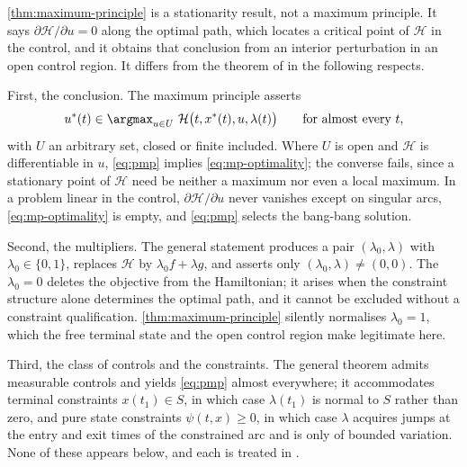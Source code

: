 \begin{remark}
	\label{rem:pmp-general}
	\autoref{thm:maximum-principle} is a stationarity result, not a maximum
	principle. It says $\partial\mathcal{H}/\partial u=0$ along the optimal path,
	which locates a critical point of $\mathcal{H}$ in the control, and it obtains
	that conclusion from an interior perturbation in an open control region. It
	differs from the theorem of \textcite{pontryagin1962mathematical} in the
	following respects.

	First, the conclusion. The maximum principle asserts
	\begin{equation}\label{eq:pmp}
		u^{\ast}(t)\in\argmax_{u\in U}\ \mathcal{H}\bigl(t,x^{\ast}(t),u,\lambda(t)\bigr)
		\qquad\text{for almost every }t,
	\end{equation}
	with $U$ an arbitrary set, closed or finite included. Where $U$ is open and
	$\mathcal{H}$ is differentiable in $u$, \eqref{eq:pmp} implies
	\eqref{eq:mp-optimality}; the converse fails, since a stationary point of
	$\mathcal{H}$ need be neither a maximum nor even a local maximum. In a problem
	linear in the control, $\partial\mathcal{H}/\partial u$ never vanishes except on
	singular arcs, \eqref{eq:mp-optimality} is empty, and \eqref{eq:pmp} selects the
	bang-bang solution.

	Second, the multipliers. The general statement produces a pair
	$(\lambda_0,\lambda)$ with $\lambda_0\in\{0,1\}$, replaces $\mathcal{H}$ by
	$\lambda_0f+\lambda g$, and asserts only $(\lambda_0,\lambda)\neq(0,0)$. The
	 $\lambda_0=0$ deletes the objective
	from the Hamiltonian; it arises when the constraint structure alone determines
	the optimal path, and it cannot be excluded without a constraint qualification.
	\autoref{thm:maximum-principle} silently normalises $\lambda_0=1$, which the
	free terminal state and the open control region make legitimate here.

	Third, the class of controls and the constraints. The general theorem admits
	measurable controls and yields \eqref{eq:pmp} almost everywhere; it accommodates
	terminal constraints $x(t_1)\in S$, in which case $\lambda(t_1)$ is normal to
	$S$ rather than zero, and pure state constraints $\psi(t,x)\geq0$, in which case
	$\lambda$ acquires jumps at the entry and exit times of the constrained arc and
	is only of bounded variation. None of these appears below, and each is treated
	in \textcite{kamien1981dynamic}.
\end{remark}

